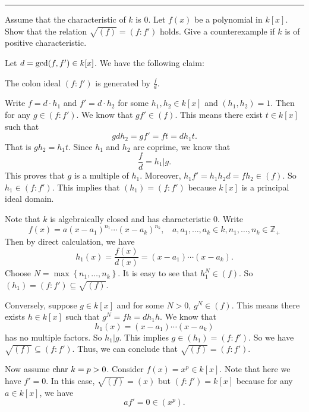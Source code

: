 \documentclass[letterpaper, 12pt]{article}
\begin{document}
\noindent\rule{7in}{2.8pt}
\begin{problem}{1.4}
Assume that the characteristic of \(k\) is \(0\). Let \(f(x)\) be a polynomial in \(k[x]\). Show that the relation \(\sqrt{(f)}=(f:f')\) holds. Give a counterexample if \(k\) is of positive characteristic.
\end{problem}
\begin{solution}
Let \(d=\text{gcd}(f,f')\in k[x]\). We have the following claim:
\begin{claim}
    The colon ideal \((f:f')\) is generated by \(\frac{f}{d}\).
\end{claim}
\begin{claimproof}
    Write \(f=d\cdot h_1\) and \(f'=d\cdot h_2\) for some \(h_1,h_2\in k[x]\) and \((h_1,h_2)=1\). Then for any \(g\in (f:f')\). We know that \(gf'\in (f)\). This means there exist \(t\in k[x]\) such that 
    \[gdh_2=gf'=ft=dh_1t.\]
    That is \(gh_2=h_1t\). Since \(h_1\) and \(h_2\) are coprime, we know that 
    \[\frac{f}{d}=h_1|g.\]
    This proves that \(g\) is a multiple of \(h_1\). Moreover, \(h_1f'=h_1h_2d=fh_2\in (f)\). So \(h_1\in (f:f')\). This implies that \((h_1)=(f:f')\) because \(k[x]\) is a principal ideal domain. 
\end{claimproof}

Note that \(k\) is algebraically closed and has characteristic 0. Write 
\[f(x)=a(x-a_1)^{n_1}\cdots(x-a_k)^{n_k},\ \ \ \ a,a_1,\ldots,a_k\in k, n_1,\ldots,n_k\in \mathbb{Z}_+\] 
Then by direct calculation, we have 
\[h_1(x)=\frac{f(x)}{d(x)}=(x-a_1)\cdots (x-a_k).\]
Choose \(N=\max\left\{ n_1,\ldots,n_k \right\}\). It is easy to see that \(h_1^N\in (f)\). So \((h_1)=(f:f')\subseteq \sqrt{(f)}\). 

Conversely, suppose \(g\in k[x]\) and for some \(N>0\), \(g^N\in (f)\). This means there exists \(h\in k[x]\) such that \(g^N=fh=dh_1h\). We know that 
\[h_1(x)=(x-a_1)\cdots (x-a_k)\]
has no multiple factors. So \(h_1|g\). This implies \(g\in (h_1)=(f:f')\). So we have \(\sqrt{(f)}\subseteq (f:f')\). Thus, we can conclude that \(\sqrt{(f)}=(f:f')\).

Now assume \(\text{char}\ k=p>0\). Consider \(f(x)=x^p\in k[x]\). Note that here we have \(f'=0\). In this case, \(\sqrt{(f)}=(x)\) but \((f:f')=k[x]\) because for any \(a\in k[x]\), we have 
\[af'=0\in (x^p).\]
\end{solution}
\end{document}
